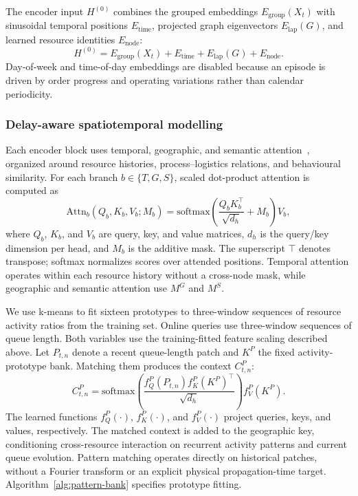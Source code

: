 \documentclass[a4paper,fleqn]{cas-dc}
\begin{document}
The encoder input $H^{(0)}$ combines the grouped embeddings $E_{\mathrm{group}}(X_t)$ with sinusoidal temporal positions $E_{\mathrm{time}}$, projected graph eigenvectors $E_{\mathrm{lap}}(G)$, and learned resource identities $E_{\mathrm{node}}$:
\begin{equation}
H^{(0)}=E_{\mathrm{group}}(X_t)+
E_{\mathrm{time}}+E_{\mathrm{lap}}(G)+E_{\mathrm{node}}.
\end{equation}
Day-of-week and time-of-day embeddings are disabled because an episode is driven by order progress and operating variations rather than calendar periodicity.

\subsubsection{Delay-aware spatiotemporal modelling}

Each encoder block uses temporal, geographic, and semantic attention~\cite{jiang2023pdformer}, organized around resource histories, process--logistics relations, and behavioural similarity. For each branch $b\in\{T,G,S\}$, scaled dot-product attention is computed as
\begin{equation}
\mathrm{Attn}_{b}(Q_b,K_b,V_b;M_b)
=\mathrm{softmax}\!\left(
\frac{Q_bK_b^\top}{\sqrt{d_h}}+M_b
\right)V_b ,
\end{equation}
where $Q_b$, $K_b$, and $V_b$ are query, key, and value matrices, $d_h$ is the query/key dimension per head, and $M_b$ is the additive mask. The superscript $\top$ denotes transpose; softmax normalizes scores over attended positions. Temporal attention operates within each resource history without a cross-node mask, while geographic and semantic attention use $M^G$ and $M^S$.

We use k-means to fit sixteen prototypes to three-window sequences of resource activity ratios from the training set. Online queries use three-window sequences of queue length. Both variables use the training-fitted feature scaling described above. Let $P_{t,n}$ denote a recent queue-length patch and $K^P$ the fixed activity-prototype bank. Matching them produces the context $C^P_{t,n}$:
\begin{equation}
C^P_{t,n}=
\mathrm{softmax}\!\left(
\frac{f_Q^P(P_{t,n})f_K^P(K^P)^\top}{\sqrt{d_h}}
\right)f_V^P(K^P).
\end{equation}
The learned functions $f_Q^P(\cdot)$, $f_K^P(\cdot)$, and $f_V^P(\cdot)$ project queries, keys, and values, respectively. The matched context is added to the geographic key, conditioning cross-resource interaction on recurrent activity patterns and current queue evolution. Pattern matching operates directly on historical patches, without a Fourier transform or an explicit physical propagation-time target. Algorithm~\ref{alg:pattern-bank} specifies prototype fitting.
\end{document}
